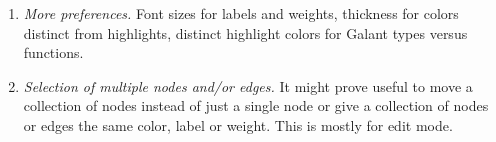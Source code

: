 \begin{enumerate}
\item \emph{More preferences.} Font sizes for labels and weights, thickness for colors
  distinct from highlights, distinct highlight colors for Galant types versus functions. 

\item \emph{Selection of multiple nodes and/or edges.}  It might prove useful
  to move a collection of nodes instead of just a single node or give a
  collection of nodes or edges the same color, label or weight. This is
  mostly for edit mode.
\end{enumerate}
